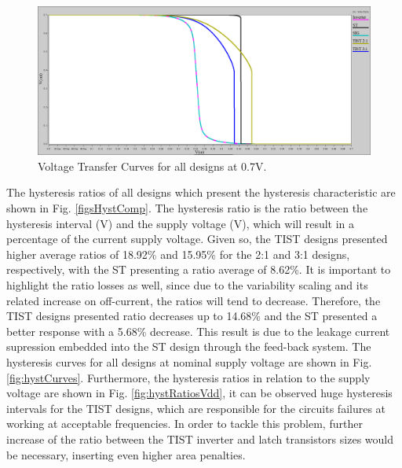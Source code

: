 \documentclass[pgmicro,mestrado,english]{iiufrgs}
\begin{document}
        \begin{figure}[]
        \centering
            \includegraphics[width=1\textwidth, trim={0cm 0cm 0cm 0cm}, clip]{vtcs07.png}
            \caption{Voltage Transfer Curves for all designs at 0.7V.}
        \label{fig:vtcs07}
    \end{figure}
    
    The hysteresis ratios of all designs which present the hysteresis characteristic are shown in Fig. \ref{figsHystComp}. The hysteresis ratio is the ratio between the hysteresis interval (V) and the supply voltage (V), which will result in a percentage of the current supply voltage. Given so, the TIST designs presented higher average ratios of 18.92\% and 15.95\% for the 2:1 and 3:1 designs, respectively, with the ST presenting a ratio average of 8.62\%. It is important to highlight the ratio losses as well, since due to the variability scaling and its related increase on off-current, the ratios will tend to decrease. Therefore, the TIST designs presented ratio decreases up to 14.68\% and the ST presented a better response with a 5.68\% decrease. This result is due to the leakage current supression embedded into the ST design through the feed-back system. The hysteresis curves for all designs at nominal supply voltage are shown in Fig. \ref{fig:hystCurves}. Furthermore, the hysteresis ratios in relation to the supply voltage are shown in Fig. \ref{fig:hystRatiosVdd}, it can be observed huge hysteresis intervals for the TIST designs, which are responsible for the circuits failures at working at acceptable frequencies. In order to tackle this problem, further increase of the ratio between the TIST inverter and latch transistors sizes would be necessary, inserting even higher area penalties.
    
\end{document}
